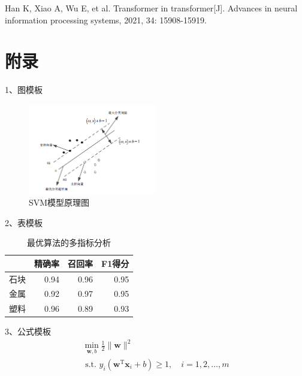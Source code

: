 \documentclass{article}
\begin{document}
\begin{thebibliography}{10}

Han K, Xiao A, Wu E, et al. Transformer in transformer[J]. Advances in neural information processing systems, 2021, 34: 15908-15919.
\end{thebibliography}

\newpage{}
\appendix
\section{附录}
\begin{appendices}
1、图模板
\begin{figure}[htpb]               
	\centering
	\includegraphics[width=0.5\textwidth]{svm.png}
	\caption{SVM模型原理图}
	\label{fig:svm}
\end{figure}

2、表模板
\begin{table}[htpb]
\caption{最优算法的多指标分析}
\begin{center}\label{table:score}
\begin{tabular}{|c|r|r|r|}
\hline
   & \multicolumn{1}{c|}{精确率} & \multicolumn{1}{c|}{召回率} & \multicolumn{1}{c|}{F1得分} \\ \hline
石块 & 0.94                     & 0.96                     & 0.95                      \\ \hline
金属 & 0.92                     & 0.97                     & 0.95                      \\ \hline
塑料 & 0.96                     & 0.89                     & 0.93                      \\ \hline
\end{tabular}
\end{center}
\end{table}

3、公式模板
\begin{equation}\label{eq:svmsuper}
\begin{array}{l}
\min _{\boldsymbol{w}, b} \frac{1}{2}\|\boldsymbol{w}\|^{2} \\
\text { s.t. } y_{i}\left(\boldsymbol{w}^{\mathrm{T}} \boldsymbol{x}_{i}+b\right) \geqslant 1, \quad i=1,2, \ldots, m
\end{array}
\end{equation}



\end{appendices}
\end{document}
